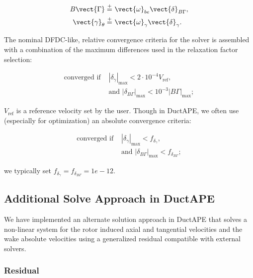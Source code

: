 \begin{align}
    \label{eqn:updatecirculation}
    B\vect{\Gamma} \stackrel{+}{=}&~ \vect{\omega}_{be} \vect{\delta}_{B\Gamma}, \\
    \label{eqn:updategammatheta}
    \vect{\gamma}_\theta \stackrel{+}{=}&~ \vect{\omega}_\gamma \vect{\delta}_\gamma.
\end{align}

The nominal DFDC-like, relative convergence criteria for the solver is assembled with a combination of the maximum differences used in the relaxation factor selection:

\begin{equation}
    \label{eqn:convergencecrit}
    \begin{aligned}
        \text{converged if } &|\delta_\gamma|_\text{max} < 2\cdot10^{-4} V_\text{ref}, \\
    &\text{and  } |\delta_{B\Gamma}|_\text{max} < 10^{-3}|B\Gamma|_\text{max};
    \end{aligned}
\end{equation}

\where \(V_\text{ref}\) is a reference velocity set by the user.
%
Though in DuctAPE, we often use (especially for optimization) an absolute convergence criteria:

\begin{equation}
    \label{eqn:convergencecritabs}
    \begin{aligned}
        \text{converged if } &|\delta_\gamma|_\text{max} < f_{\delta_\gamma}, \\
                 &\text{and  } |\delta_{B\Gamma}|_\text{max} < f_{\delta_{B\Gamma}};
    \end{aligned}
\end{equation}

\where we typically set \(f_{\delta_\gamma}=f_{\delta_{B\Gamma}}=1e-12\).


\subsection{Additional Solve Approach in DuctAPE}

We have implemented an alternate solution approach in DuctAPE that solves a non-linear system for the rotor induced axial and tangential velocities and the wake absolute velocities using a generalized residual compatible with external solvers.

\subsubsection{Residual}
\label{sssec:dtresid}

